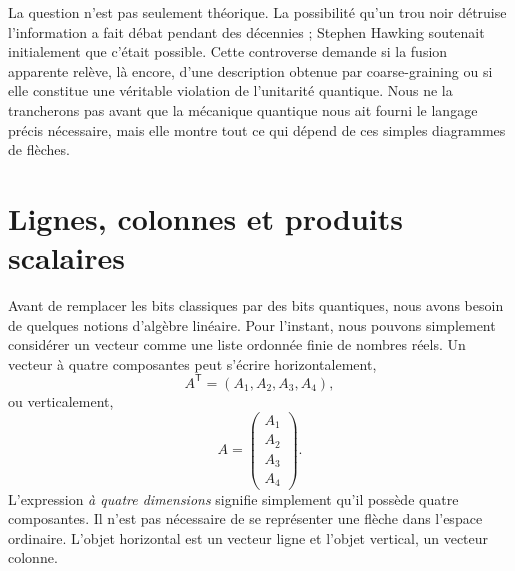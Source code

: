 \begin{classroomqa}
\end{classroomqa}

La question n’est pas seulement théorique. La possibilité qu’un trou noir détruise l’information a fait débat pendant des décennies ; Stephen Hawking soutenait initialement que c’était possible. Cette controverse demande si la fusion apparente relève, là encore, d’une description obtenue par coarse-graining ou si elle constitue une véritable violation de l’unitarité quantique. Nous ne la trancherons pas avant que la mécanique quantique nous ait fourni le langage précis nécessaire, mais elle montre tout ce qui dépend de ces simples diagrammes de flèches.

\section{Lignes, colonnes et produits scalaires}

Avant de remplacer les bits classiques par des bits quantiques, nous avons besoin de quelques notions d’algèbre linéaire. Pour l’instant, nous pouvons simplement considérer un vecteur comme une liste ordonnée finie de nombres réels. Un vecteur à quatre composantes peut s’écrire horizontalement,
\begin{equation}
  A^{\mathsf T}=(A_1,A_2,A_3,A_4),
  \label{eq:l01-row-vector}
\end{equation}
ou verticalement,
\begin{equation}
  A=
  \begin{pmatrix}
    A_1\\ A_2\\ A_3\\ A_4
  \end{pmatrix}.
  \label{eq:l01-column-vector}
\end{equation}
L’expression \emph{à quatre dimensions} signifie simplement qu’il possède quatre composantes. Il n’est pas nécessaire de se représenter une flèche dans l’espace ordinaire. L’objet horizontal est un vecteur ligne et l’objet vertical, un vecteur colonne.

